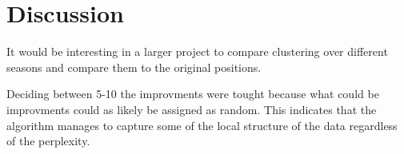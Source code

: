 \documentclass{article}
\begin{document}
 

\section{Discussion}

It would be interesting in a larger project to compare clustering over different seasons and compare them to the original positions.

Deciding between 5-10 the improvments were tought because what could be improvments could as likely be assigned as random.
 This indicates that the algorithm manages to capture some of the local structure of the data regardless of the perplexity. 
\end{document}
